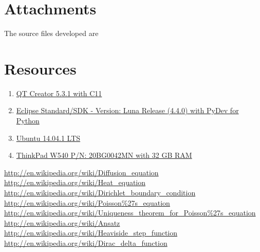 \documentclass[11pt,english,a4paper]{article}
\begin{document}
\begin{flushleft}
\section{Attachments}

The source files developed are


\section{Resources}

\begin{enumerate}
\item{\href{http://qt-project.org/downloads}{QT Creator 5.3.1 with C11}}
\item{\href{https://www.eclipse.org/downloads/}{Eclipse Standard/SDK  - Version: Luna Release (4.4.0) with PyDev for Python}}
\item{\href{http://www.ubuntu.com/download/desktop}{Ubuntu 14.04.1 LTS}}
\item{\href{http://shop.lenovo.com/no/en/laptops/thinkpad/w-series/w540/#tab-reseller}{ThinkPad W540 P/N: 20BG0042MN with 32 GB RAM}}
\end{enumerate}

\begin{thebibliography}{1}
\href{http://en.wikipedia.org/wiki/Diffusion\_equation}{http://en.wikipedia.org/wiki/Diffusion\_equation}
\href{http://en.wikipedia.org/wiki/Heat\_equation}{http://en.wikipedia.org/wiki/Heat\_equation}
\href{http://en.wikipedia.org/wiki/Dirichlet\_boundary\_condition}{http://en.wikipedia.org/wiki/Dirichlet\_boundary\_condition}
\href{http://en.wikipedia.org/wiki/Poisson\%27s\_equation}{http://en.wikipedia.org/wiki/Poisson\%27s\_equation}
\href{http://en.wikipedia.org/wiki/Uniqueness\_theorem\_for\_Poisson\%27s\_equation}{http://en.wikipedia.org/wiki/Uniqueness\_theorem\_for\_Poisson\%27s\_equation}
\href{http://en.wikipedia.org/wiki/Ansatz}{http://en.wikipedia.org/wiki/Ansatz}
\href{http://en.wikipedia.org/wiki/Heaviside\_step\_function}{http://en.wikipedia.org/wiki/Heaviside\_step\_function}
\href{http://en.wikipedia.org/wiki/Dirac\_delta\_function}{http://en.wikipedia.org/wiki/Dirac\_delta\_function}
\end{thebibliography}

\end{flushleft}
\end{document}
